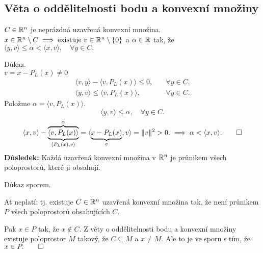 \subsection{Věta o oddělitelnosti bodu a konvexní množiny} \label{oddel}
\begin{multicols}{2}

\columnbreak
    \hspace*{-2cm}
    $C \in \mathbb{R}^n$ je neprázdná uzavřená konvexní množina.
    \\
    \hspace*{-2cm}
    $x \in \mathbb{R}^n \setminus C \implies \text{existuje } v \in \mathbb{R}^n \setminus \left\lbrace 0 \right\rbrace$ a $\alpha \in \mathbb{R}$ tak, že
    \\
    $\langle y, v\rangle \leq \alpha < \langle x, v\rangle, \quad \forall y \in C.$
\end{multicols}
Důkaz.\\
$v = x - P_L (x) \not=0$
\begin{align*}
    \langle v, y\rangle - \langle v, P_L(x)\rangle \leq 0,& \quad \forall y \in C. \\
    \langle y, v\rangle \leq \langle v, P_L (x)\rangle,& \quad \forall y \in C.
\end{align*}
Položme $\alpha = \langle v, P_L (x)\rangle$.
\[
    \langle y, v\rangle \leq \alpha, \quad \forall y \in C.
\]
\[
    \langle x, v\rangle - \underbrace{\overbrace{\langle v, P_L (x)\rangle}^{\alpha}}_{\langle P_L(x), v\rangle} = 
    \langle \underbrace{x - P_L (x)}_{v}, v\rangle = \| v\|^2 > 0. \implies \alpha < \langle x, v\rangle. \qed
\]
\textbf{Důsledek:} Každá uzavřená konvexní množina v $\mathbb{R}^n$ je průnikem všech poloprostorů, které ji obsahují.

Důkaz sporem.

Ať neplatí: tj. existuje $C \in \mathbb{R}^n$ uzavřená konvexní množina tak, že není průnikem $P$ všech poloprostorů 
obsahujících $C$.

Pak $x \in P$ tak, že $x \not\in C$. Z věty o oddělitelnosti bodu a konvexní množiny existuje poloprostor $M$ takový,
že $C \subseteq M$ a $x \not= M$. Ale to je ve sporu s tím, že $x \in P. \qed$

